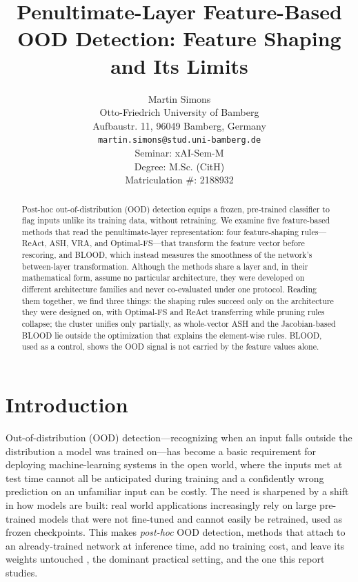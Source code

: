 \documentclass[a4paper]{article}
\title{Penultimate-Layer Feature-Based OOD Detection: Feature Shaping and Its Limits}
\author{%
  Martin Simons\\
  Otto-Friedrich University of Bamberg\\
  Aufbaustr. 11, 96049 Bamberg, Germany\\
  \texttt{martin.simons@stud.uni-bamberg.de} \\[0.5cm]
  Seminar: xAI-Sem-M \\
  Degree: M.Sc. (CitH) \\
  Matriculation \#: 2188932
}
\begin{document}
\maketitle
\def\va{{\bm{a}}}

\begin{abstract}
  Post-hoc out-of-distribution (OOD) detection equips a frozen, pre-trained
  classifier to flag inputs unlike its training data, without retraining. We examine
  five feature-based methods that read the penultimate-layer representation: four
  feature-shaping rules---ReAct, ASH, VRA, and Optimal-FS---that transform the feature
  vector before rescoring, and BLOOD, which instead measures the smoothness of the
  network's between-layer transformation. Although the methods share a layer and, in
  their mathematical form, assume no particular architecture, they were developed on
  different architecture families and never co-evaluated under one protocol. Reading
  them together, we find three things: the shaping rules succeed only on the
  architecture they were designed on, with Optimal-FS and ReAct transferring while pruning rules collapse; the
  cluster unifies only partially, as whole-vector ASH and the Jacobian-based BLOOD lie
  outside the optimization that explains the element-wise rules. BLOOD, used as a
  control, shows the OOD signal is not carried by the feature values alone.
\end{abstract}


\section{Introduction}
\label{intro}


Out-of-distribution (OOD) detection---recognizing when an input falls outside the
distribution a model was trained on---has become a basic requirement for deploying
machine-learning systems in the open world, where the inputs met at test time cannot
all be anticipated during training and a confidently wrong prediction on an unfamiliar
input can be costly. The need is sharpened by a shift in how models are built:
real world applications increasingly rely on large pre-trained models that were not fine-tuned and
cannot easily be retrained, used as frozen checkpoints. This makes \emph{post-hoc}
OOD detection, methods that attach to an already-trained network at inference time,
add no training cost, and leave its weights untouched \cite{survey}, the dominant practical setting,
and the one this report studies.
\end{document}
